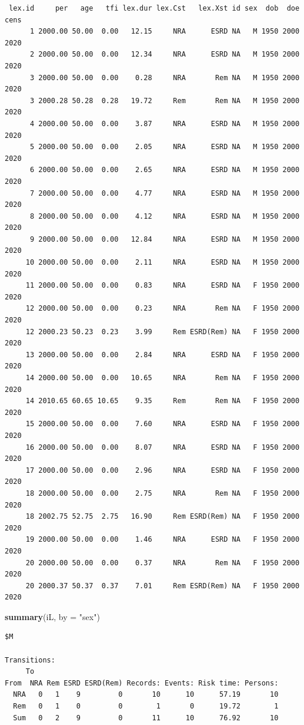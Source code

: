 \documentclass[
]{book}
\newenvironment{Shaded}{\begin{snugshade}}{\end{snugshade}}
\newcommand{\AttributeTok}[1]{\textcolor[rgb]{0.13,0.29,0.53}{#1}}
\newcommand{\FunctionTok}[1]{\textcolor[rgb]{0.13,0.29,0.53}{\textbf{#1}}}
\newcommand{\NormalTok}[1]{#1}
\newcommand{\StringTok}[1]{\textcolor[rgb]{0.31,0.60,0.02}{#1}}
\begin{document}
\begin{enumerate}
\begin{verbatim}
 lex.id     per   age   tfi lex.dur lex.Cst   lex.Xst id sex  dob  doe cens
      1 2000.00 50.00  0.00   12.15     NRA      ESRD NA   M 1950 2000 2020
      2 2000.00 50.00  0.00   12.34     NRA      ESRD NA   M 1950 2000 2020
      3 2000.00 50.00  0.00    0.28     NRA       Rem NA   M 1950 2000 2020
      3 2000.28 50.28  0.28   19.72     Rem       Rem NA   M 1950 2000 2020
      4 2000.00 50.00  0.00    3.87     NRA      ESRD NA   M 1950 2000 2020
      5 2000.00 50.00  0.00    2.05     NRA      ESRD NA   M 1950 2000 2020
      6 2000.00 50.00  0.00    2.65     NRA      ESRD NA   M 1950 2000 2020
      7 2000.00 50.00  0.00    4.77     NRA      ESRD NA   M 1950 2000 2020
      8 2000.00 50.00  0.00    4.12     NRA      ESRD NA   M 1950 2000 2020
      9 2000.00 50.00  0.00   12.84     NRA      ESRD NA   M 1950 2000 2020
     10 2000.00 50.00  0.00    2.11     NRA      ESRD NA   M 1950 2000 2020
     11 2000.00 50.00  0.00    0.83     NRA      ESRD NA   F 1950 2000 2020
     12 2000.00 50.00  0.00    0.23     NRA       Rem NA   F 1950 2000 2020
     12 2000.23 50.23  0.23    3.99     Rem ESRD(Rem) NA   F 1950 2000 2020
     13 2000.00 50.00  0.00    2.84     NRA      ESRD NA   F 1950 2000 2020
     14 2000.00 50.00  0.00   10.65     NRA       Rem NA   F 1950 2000 2020
     14 2010.65 60.65 10.65    9.35     Rem       Rem NA   F 1950 2000 2020
     15 2000.00 50.00  0.00    7.60     NRA      ESRD NA   F 1950 2000 2020
     16 2000.00 50.00  0.00    8.07     NRA      ESRD NA   F 1950 2000 2020
     17 2000.00 50.00  0.00    2.96     NRA      ESRD NA   F 1950 2000 2020
     18 2000.00 50.00  0.00    2.75     NRA       Rem NA   F 1950 2000 2020
     18 2002.75 52.75  2.75   16.90     Rem ESRD(Rem) NA   F 1950 2000 2020
     19 2000.00 50.00  0.00    1.46     NRA      ESRD NA   F 1950 2000 2020
     20 2000.00 50.00  0.00    0.37     NRA       Rem NA   F 1950 2000 2020
     20 2000.37 50.37  0.37    7.01     Rem ESRD(Rem) NA   F 1950 2000 2020
\end{verbatim}

\begin{Shaded}
\begin{Highlighting}[]
\FunctionTok{summary}\NormalTok{(iL, }\AttributeTok{by =} \StringTok{"sex"}\NormalTok{)}
\end{Highlighting}
\end{Shaded}

\begin{verbatim}
$M

Transitions:
     To
From  NRA Rem ESRD ESRD(Rem) Records: Events: Risk time: Persons:
  NRA   0   1    9         0       10      10      57.19       10
  Rem   0   1    0         0        1       0      19.72        1
  Sum   0   2    9         0       11      10      76.92       10


\end{verbatim}
\end{enumerate}
\end{document}
